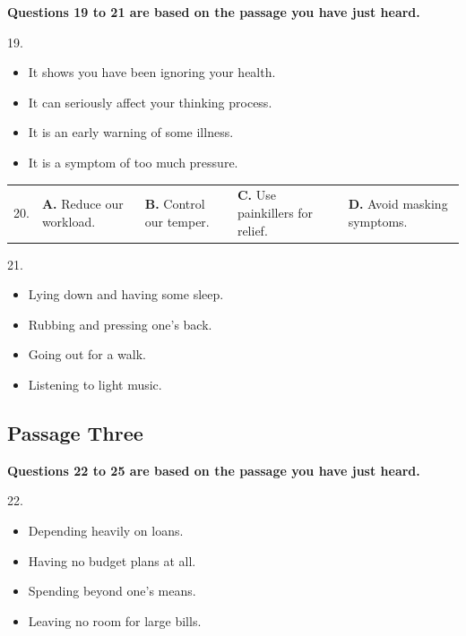\documentclass[UTF8,11pt]{ctexart}
\begin{document}
\textbf{Questions 19 to 21 are based on the passage you have just heard.}


19.


\begin{itemize}[leftmargin=2em,itemsep=.2em,topsep=.4em]\item[A.] It shows you have been ignoring your health.
\item[B.] It can seriously affect your thinking process.
\item[C.] It is an early warning of some illness.
\end{itemize}

\begin{itemize}[leftmargin=2em,itemsep=.2em,topsep=.4em]\item[D.] It is a symptom of too much pressure.
\end{itemize}

\noindent\begin{tabularx}{\linewidth}{@{}lXXXX@{}}20. & \textbf{A.} Reduce our workload. & \textbf{B.} Control our temper. & \textbf{C.} Use painkillers for relief. & \textbf{D.} Avoid masking symptoms.\\\end{tabularx}\par

21.


\begin{itemize}[leftmargin=2em,itemsep=.2em,topsep=.4em]\item[A.] Lying down and having some sleep.
\item[B.] Rubbing and pressing one’s back.
\item[C.] Going out for a walk.
\item[D.] Listening to light music.
\end{itemize}

\subsection*{Passage Three}


\textbf{Questions 22 to 25 are based on the passage you have just heard.}


22.


\begin{itemize}[leftmargin=2em,itemsep=.2em,topsep=.4em]\item[A.] Depending heavily on loans.
\item[B.] Having no budget plans at all.
\item[C.] Spending beyond one’s means.
\item[D.] Leaving no room for large bills.
\end{itemize}
\end{document}
